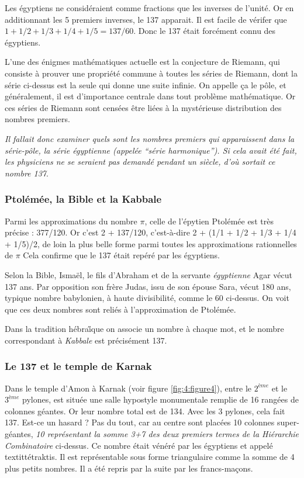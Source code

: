 \documentclass[a4paper,12pt]{article}
\begin{document}
       Les égyptiens ne considéraient comme fractions que les inverses de l'unité. Or en additionnant les 5 premiers inverses, le 137 apparait. Il est facile de vérifer que $1+1/2+1/3+1/4+1/5 = 137/60$. Donc le 137 était forcément connu des égyptiens.

L'une des énigmes mathématiques actuelle est la conjecture de Riemann, qui consiste à prouver une propriété commune à toutes les séries de Riemann, dont la série ci-dessus est la seule qui donne une suite infinie. On appelle ça le pôle, et généralement, il est d'importance centrale dans tout problème mathématique. Or ces séries de Riemann sont censées être liées à la mystérieuse distribution des nombres premiers. 


\textit{Il fallait donc examiner quels sont les nombres premiers qui apparaissent dans la série-pôle, la série égyptienne (appelée ``série harmonique''). Si cela avait été fait, les physiciens ne se seraient pas demandé pendant un siècle, d'où sortait ce nombre 137}.


\subsubsection{Ptolémée, la Bible et la Kabbale}

      Parmi les approximations du nombre $\pi$, celle de l'épytien Ptolémée est très précise : 377/120. Or c'est 2 + 137/120, c'est-à-dire 2 + (1/1 + 1/2 + 1/3 + 1/4 + 1/5)/2, de loin la plus belle forme parmi toutes les approximations rationnelles de $\pi$  Cela confirme que le 137 était repéré par les égyptiens. 
      
      
      Selon la Bible, Ismaël, le fils d'Abraham et de la servante \textit{égyptienne} Agar vécut 137 ans.  Par opposition son frère Judas, issu de son épouse Sara, vécut 180 ans, typique nombre babylonien, à haute divisibilité, comme le 60 ci-dessus. On voit que ces deux nombres sont reliés à l'approximation de Ptolémée. 
      
      
      Dans la tradition hébra\H ique on associe un nombre à chaque mot, et le nombre correspondant à \textit{Kabbale} est précisément 137.


\subsubsection{Le 137 et le temple de Karnak}

     Dans le temple d'Amon à Karnak (voir figure \ref{fig:4:figure4}), entre le $2^{ème}$ et le $3^{ème}$ pylones, est située une salle hypostyle monumentale remplie de 16 rangées de colonnes géantes. Or leur nombre total est de 134. Avec les 3 pylones, cela fait 137. Est-ce un hasard  ? Pas du tout, car au centre sont placées 10 colonnes super-géantes, \textit{10 représentant la somme 3+7 des deux premiers termes de la Hiérarchie Combinatoire} ci-dessus. Ce nombre était vénéré par les égyptiens et appelé textit{tétraktis}. Il est représentable sous forme triangulaire comme la somme de 4 plus petits nombres. Il a été repris par la suite par les francs-maçons.
\end{document}

